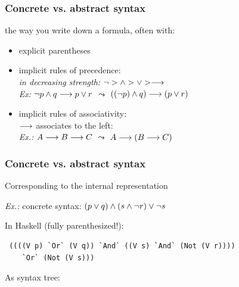 \documentclass{beamer}
\begin{document}
\begin{frame}[fragile]\frametitle{Concrete vs. abstract syntax}

   the way you write down a formula, often with:
  \begin{itemize}
  \item explicit parentheses
  \item implicit rules of precedence: \\
    \emph{in decreasing strength:} $\neg >  \wedge > \vee > \longrightarrow$\\
    \emph{Ex:}  $\neg p \wedge q \longrightarrow p \vee r$ $\leadsto$ $((\neg p) \wedge q) \longrightarrow (p \vee r)$
  \item implicit rules of associativity: \\
    $\longrightarrow$ associates to the left:\\
    \emph{Ex.:} $A \longrightarrow B \longrightarrow C$ $\leadsto$ $A \longrightarrow (B \longrightarrow C)$
  \end{itemize}

\end{frame}

\begin{frame}[fragile]\frametitle{Concrete vs. abstract syntax}

   Corresponding to the internal representation

  \emph{Ex.:} concrete syntax: $(p \vee q) \wedge (s \wedge \neg r) \vee \neg s$

  \vspace{5mm}
  In Haskell (fully parenthesized!):
  \begin{lstlisting}
 ((((V p) `Or` (V q)) `And` ((V s) `And` (Not (V r)))) 
    `Or` (Not (V s)))
  \end{lstlisting}
  

  \vspace{5mm}
  As syntax tree:
\begin{center}
\mbox{
}
\end{center}
\end{frame}
\end{document}
